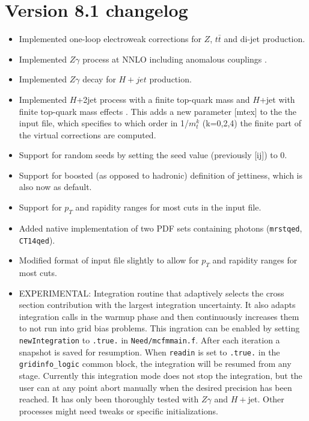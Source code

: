 \documentclass{article}
\begin{document}
{{{{{{\clearpage

\section{Version 8.1 changelog}
\label{changelog8.1}
\begin{itemize}
\item Implemented one-loop electroweak corrections for $Z$, $t\bar t$ and di-jet production.
\item Implemented $Z\gamma$ process at NNLO including anomalous couplings \cite{Campbell:2017aul}.
\item Implemented $Z\gamma$ decay for $H+jet$ production.
\item Implemented $H$+2jet process with a finite top-quark mass and $H$+jet with finite
top-quark mass effects \cite{Neumann:2016dny}. This adds a new parameter [mtex] to the
the input file, which specifies to which order in 1/$m_t^k$ (k=0,2,4) the finite
part of the virtual corrections are computed.
\item Support for random seeds by setting the seed value (previously [ij]) to 0.
\item Support for boosted (as opposed to hadronic) definition of jettiness, which
is also now as default.
\item Support for $p_T$ and rapidity ranges for most cuts in the input file.
\item Added native implementation of two PDF sets containing photons ({\tt mrstqed}, {\tt CT14qed}).
\item Modified format of input file slightly to allow for $p_T$ and rapidity ranges for most cuts.
\item EXPERIMENTAL: Integration routine that adaptively selects the cross section
contribution with the largest integration uncertainty. It also adapts
integration calls in the warmup phase and then continuously increases them to
not run into grid bias problems. This ingration can be enabled by setting
{\tt newIntegration} to {\tt .true.} in {\tt Need/mcfmmain.f}. After each iteration a snapshot is
saved for resumption. When {\tt readin} is set to {\tt .true.} in the {\tt gridinfo\_logic}
common block, the integration will be resumed from any stage. Currently this
integration mode does not stop the integration, but the user can at any point
abort manually when the desired precision has been reached. It has only been
thoroughly tested with $Z\gamma$ and $H+$jet. Other processes might need
tweaks or specific initializations.


\end{itemize}}}}}}}
\end{document}
